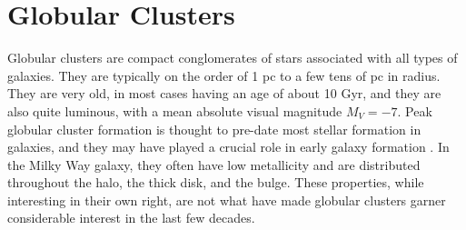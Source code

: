 \section{Globular Clusters}

Globular clusters are compact conglomerates of stars associated with all types of galaxies. They are typically on the order of 1 pc to a few tens of pc in radius. They are very old, in most cases having an age of about 10 Gyr, and they are also quite luminous, with a mean absolute visual magnitude $M_{V} = -7$. Peak globular cluster formation is thought to pre-date most stellar formation in galaxies, and they may have played a crucial role in early galaxy formation \cite{Gratton2019}. In the Milky Way galaxy, they often have low metallicity and are distributed throughout the halo, the thick disk, and the bulge. These properties, while interesting in their own right, are not what have made globular clusters garner considerable interest in the last few decades.

